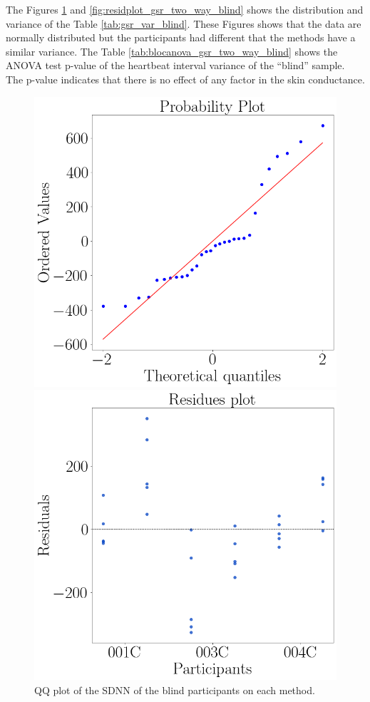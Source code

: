 The Figures \ref{fig:qqplot_gsr_two_way_blind} and \ref{fig:residplot_gsr_two_way_blind} shows the distribution and variance of the Table \ref{tab:gsr_var_blind}. These Figures shows that the data are normally distributed but the participants had different  that the methods have a similar variance.
The Table \ref{tab:blocanova_gsr_two_way_blind} shows the ANOVA test p-value of the heartbeat interval variance of the “blind” sample. The p-value indicates that there is no effect of any factor in the skin conductance.



\begin{figure}[!htb]
    \centering
    \begin{minipage}{0.45\textwidth}
        \centering
        \includegraphics[width = 0.8\linewidth]{Resultados/GSR/Figuras/png/qqplot_gsr_two_way_blind.png}
        \caption{QQ plot of the SDNN of the blind participants on each method.}
        \label{fig:qqplot_gsr_two_way_blind}
    \end{minipage}
    \begin{minipage}{0.45\textwidth}
        \centering
        \includegraphics[width = 0.8\linewidth]{Resultados/GSR/Figuras/png/residplot_gsr_two_way_blind.png}

\end{minipage}
\end{figure}

